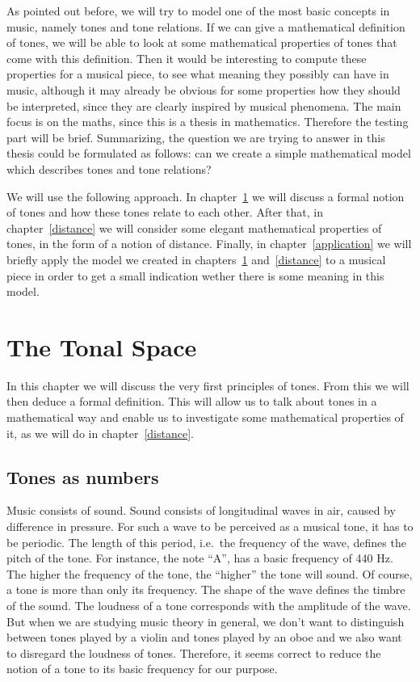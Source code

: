 \documentclass[a4paper]{book}
\theoremstyle{definition}
\begin{document}
As pointed out before, we will try to model one of the most basic concepts in music, namely tones and tone relations.
If we can give a mathematical definition of tones, we will be able to look at some mathematical properties of tones that come with this definition.
Then it would be interesting to compute these properties for a musical piece, to see what meaning they possibly can have in music, although it may already be obvious for some properties how they should be interpreted, since they are clearly inspired by musical phenomena.
The main focus is on the maths, since this is a thesis in mathematics.
Therefore the testing part will be brief.
Summarizing, the question we are trying to answer in this thesis could be formulated as follows:
can we create a simple mathematical model which describes tones and tone relations?

We will use the following approach.
In chapter~\ref{tonal_space} we will discuss a formal notion of tones and how these tones relate to each other.
After that, in chapter~\ref{distance} we will consider some elegant mathematical properties of tones, in the form of a notion of distance.
Finally, in chapter~\ref{application} we will briefly apply the model we created in chapters~\ref{tonal_space} and~\ref{distance} to a musical piece in order to get a small indication wether there is some meaning in this model.



\chapter{The Tonal Space}
\label{tonal_space}
In this chapter we will discuss the very first principles of tones.
From this we will then deduce a formal definition.
This will allow us to talk about tones in a mathematical way and enable us to investigate some mathematical properties of it, as we will do in chapter~\ref{distance}.

\section{Tones as numbers}
Music consists of sound.
Sound consists of longitudinal waves in air, caused by difference in pressure.
For such a wave to be perceived as a musical tone, it has to be periodic.
The length of this period, i.e.\ the frequency of the wave, defines the pitch of the tone.
For instance, the note ``A'', has a basic frequency of 440 Hz.
The higher the frequency of the tone, the ``higher'' the tone will sound.
Of course, a tone is more than only its frequency.
The shape of the wave defines the timbre of the sound.
The loudness of a tone corresponds with the amplitude of the wave.
But when we are studying music theory in general, we don't want to distinguish between tones played by a violin and tones played by an oboe and we also want to disregard the loudness of tones.
Therefore, it seems correct to reduce the notion of a tone to its basic frequency for our purpose.
\end{document}
